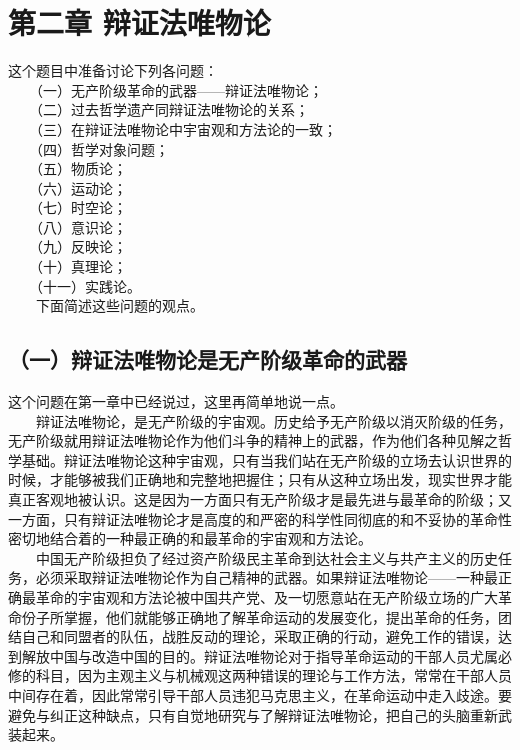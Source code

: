 \documentclass[cn,11pt,chinese]{elegantbook}
\def\myformat#1{\hfil\hfil #1}
\begin{document}
\newpage\section*{\myformat{第二章  辩证法唯物论}}
这个题目中准备讨论下列各问题：\\
　　（一）无产阶级革命的武器——辩证法唯物论；\\
　　（二）过去哲学遗产同辩证法唯物论的关系；  \\
　　（三）在辩证法唯物论中宇宙观和方法论的一致；   \\
　　（四）哲学对象问题；\\
　　（五）物质论；\\
　　（六）运动论；\\
　　（七）时空论；\\
　　（八）意识论；\\
　　（九）反映论；\\
　　（十）真理论；   \\
　　（十一）实践论。   \\
　　下面简述这些问题的观点。\\
\subsection*{\myformat{（一）辩证法唯物论是无产阶级革命的武器}}
这个问题在第一章中已经说过，这里再简单地说一点。\\
　　辩证法唯物论，是无产阶级的宇宙观。历史给予无产阶级以消灭阶级的任务，无产阶级就用辩证法唯物论作为他们斗争的精神上的武器，作为他们各种见解之哲学基础。辩证法唯物论这种宇宙观，只有当我们站在无产阶级的立场去认识世界的时候，才能够被我们正确地和完整地把握住；只有从这种立场出发，现实世界才能真正客观地被认识。这是因为一方面只有无产阶级才是最先进与最革命的阶级；又一方面，只有辩证法唯物论才是高度的和严密的科学性同彻底的和不妥协的革命性密切地结合着的一种最正确的和最革命的宇宙观和方法论。  \\
　　中国无产阶级担负了经过资产阶级民主革命到达社会主义与共产主义的历史任务，必须采取辩证法唯物论作为自己精神的武器。如果辩证法唯物论——一种最正确最革命的宇宙观和方法论被中国共产党、及一切愿意站在无产阶级立场的广大革命份子所掌握，他们就能够正确地了解革命运动的发展变化，提出革命的任务，团结自己和同盟者的队伍，战胜反动的理论，采取正确的行动，避免工作的错误，达到解放中国与改造中国的目的。辩证法唯物论对于指导革命运动的干部人员尤属必修的科目，因为主观主义与机械观这两种错误的理论与工作方法，常常在干部人员中间存在着，因此常常引导干部人员违犯马克思主义，在革命运动中走入歧途。要避免与纠正这种缺点，只有自觉地研究与了解辩证法唯物论，把自己的头脑重新武装起来。\\
\end{document}
